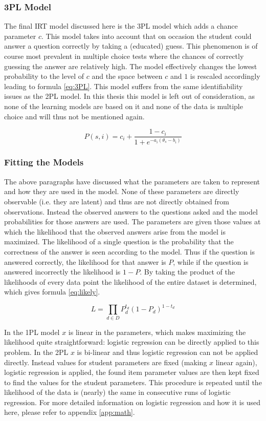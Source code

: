 \documentclass{scrartcl}
\begin{document}
\subsubsection{3PL Model}
The final IRT model discussed here is the 3PL model which adds a chance parameter $c$. This model takes into account that on occasion the student could answer a question correctly by taking a (educated) guess. This phenomenon is of course most prevalent in multiple choice tests where the chances of correctly guessing the answer are relatively high. The model effectively changes the lowest probability to the level of $c$ and the space between $c$ and $1$ is rescaled accordingly leading to formula \ref{eq:3PL}. This model suffers from the same identifiability issues as the 2PL model. In this thesis this model is left out of consideration, as none of the learning models are based on it and none of the data is multiple choice and will thus not be mentioned again. 

\begin{equation}
\label{eq:3PL}
P(s,i)= c_{i} + \frac{1-c_{i}}{1+e^{-a_{i}(\theta_{s} - b_{i})}}
\end{equation}

\subsubsection{Fitting the Models}
The above paragraphs have discussed what the parameters are taken to represent and how they are used in the model. None of these parameters are directly observable (i.e. they are latent) and thus are not directly obtained from observations. Instead the observed answers to the questions asked and the model probabilities for those answers are used. The parameters are given those values at which the likelihood that the observed answers arise from the model is maximized. The likelihood of a single question is the probability that the correctness of the answer is seen according to the model. Thus if the question is answered correctly, the likelihood for that answer is $P$, while if the question is answered incorrectly the likelihood is $1-P$. By taking the product of the likelihoods of every data point the likelihood of the entire dataset is determined, which gives formula \ref{eq:likely}.

\begin{equation}
\label{eq:likely}
L=\prod_{d \in D} P_{d}^{t_d}  (1- P_{d})^{1-t_d}
\end{equation}

In the 1PL model $x$ is linear in the parameters, which makes maximizing the likelihood quite straightforward: logistic regression can be directly applied to this problem. In the 2PL $x$ is bi-linear and thus logistic regression can not be applied directly. Instead values for student parameters are fixed (making $x$ linear again), logistic regression is applied, the found item parameter values are then kept fixed to find the values for the student parameters. This procedure is repeated until the likelihood of the data is (nearly) the same in consecutive runs of logistic regression. For more detailed information on logistic regression and how it is used here, please refer to appendix \ref{app:math}.
\end{document}
